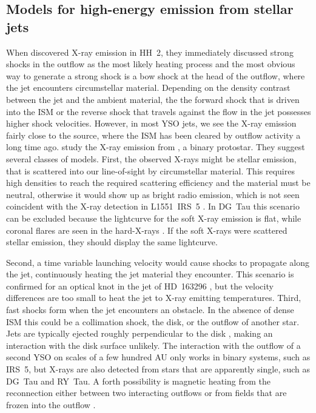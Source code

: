 \documentclass{emulateapj}
\begin{document}
\subsection{Models for high-energy emission from stellar jets}
\label{sect:intromodel}
When \citet{2001Natur.413..708P} discovered X-ray emission in HH~2, they immediately discussed strong shocks in the outflow as the most likely heating process and the most obvious way to generate a strong shock is a bow shock at the head of the outflow, where the jet encounters circumstellar material. Depending on the density contrast between the jet and the ambient material, the the forward shock that is driven into the ISM or the reverse shock that travels against the flow in the jet possesses higher shock velocities. However, in most YSO jets, we see the X-ray emission fairly close to the source, where the ISM has been cleared by outflow activity a long time ago. \citet{2003ApJ...584..843B} study the X-ray emission from , a binary protostar. They suggest several classes of models. First, the observed X-rays might be stellar emission, that is scattered into our line-of-sight by circumstellar material. This requires high densities to reach the required scattering efficiency and the material must be neutral, otherwise it would show up as bright radio emission, which is not seen coincident with the X-ray detection in L1551~IRS~5 \citep{2003ApJ...584..843B}. In DG~Tau this scenario can be excluded because the lightcurve for the soft X-ray emission is flat, while coronal flares are seen in the hard-X-rays \citep{2011ASPC..448..617G}. If the soft X-rays were scattered stellar emission, they should display the same lightcurve.

Second, a time variable launching velocity would cause shocks to propagate along the jet, continuously heating the jet material they encounter. This scenario is confirmed for an optical knot in the jet of HD~163296 \citep{2013A&A...552A.142G}, but the velocity differences are too small to heat the jet to X-ray emitting temperatures. Third, fast shocks form when the jet encounters an obstacle. In the absence of dense ISM this could be a collimation shock, the disk, or the outflow of another star. Jets are typically ejected roughly perpendicular to the disk \citep[e.g.][for IRS 5]{2002A&A...382..573F}, making an interaction with the disk surface unlikely. The interaction with the outflow of a second YSO on scales of a few hundred AU only works in binary systems, such as IRS~5, but X-rays are also detected from stars that are apparently single, such as DG~Tau and RY~Tau. A forth possibility is magnetic heating from the reconnection either between two interacting outflows \citep{2008A&A...478..453M} or from fields that are frozen into the outflow \citep{2013A&A...550L...1S}.
\end{document}
